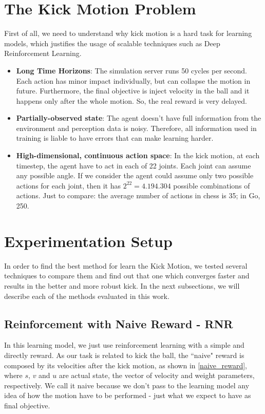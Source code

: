 \section{The Kick Motion Problem}

First of all, we need to understand why kick motion is a hard task for learning models, which justifies the usage of scalable techniques such as Deep Reinforcement Learning.

\begin{itemize}
	\item \textbf{Long Time Horizons}: The simulation server runs 50 cycles per second. Each action has minor impact individually, but can collapse the motion in future. Furthermore, the final objective is inject velocity in the ball and it happens only after the whole motion. So, the real reward is very delayed.
	
	\item \textbf{Partially-observed state}: The agent doesn't have full information from the environment and perception data is noisy. Therefore, all information used in training is liable to have errors that can make learning harder.
	
	\item \textbf{High-dimensional, continuous action space}: In the kick motion, at each timestep, the agent have to act in each of 22 joints. Each joint can assume any possible angle. If we consider the agent could assume only two possible actions for each joint, then it has $2^{22} = 4.194.304$ possible combinations of actions. Just to compare: the average number of actions in chess is 35; in Go, 250.
\end{itemize}
\section{Experimentation Setup}\label{sec:experimentation_setup}
In order to find the best method for learn the Kick Motion, we tested several techniques to compare them and find out that one which converges faster and results in the better and more robust kick. In the next subsections, we will describe each of the methods evaluated in this work.

\subsection{Reinforcement with Naive Reward - RNR }
In this learning model, we just use reinforcement learning with a simple and directly reward. As our task is related to kick the ball, the ``naive" reward is composed by its velocities after the kick motion, as shown in \ref{naive_reward}, where $s$, $v$ and $u$ are actual state, the vector of velocity and weight parameters, respectively. We call it naive because we don't pass to the learning model any idea of how the motion have to be performed - just what we expect to have as final objective. 

